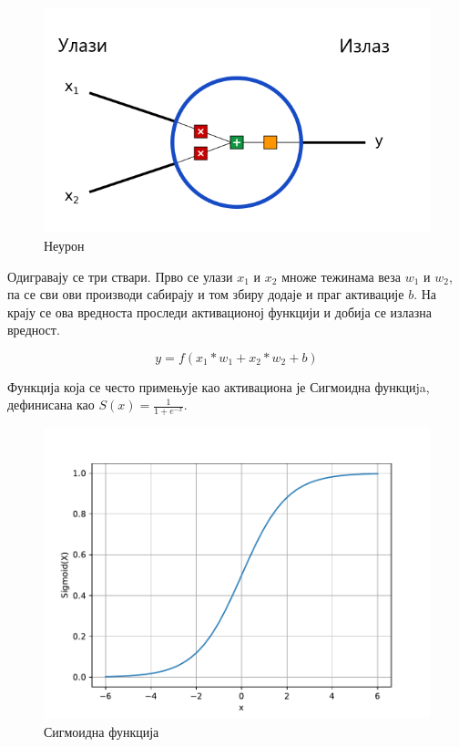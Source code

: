 \documentclass[12pt, а4paper]{article}
\begin{document}
\begin{figure}[H]
  \centering
      \includegraphics[scale=0.5]{slike/neuron}
  \caption{Неурон}
  \label{fig:neuron}
\end{figure}

Одигравају се три ствари. Прво се улази $x_1$ и $x_2$ множе тежинама
веза $w_1$ и $w_2$, па се сви ови производи сабирају
и том збиру додаје и праг активације $b$.
На крају се ова вредноста проследи активационој функцији и добија се излазна вредност.

\begin{equation}
 y = f(x_1 * w_1 + x_2 * w_2 + b)
\end{equation}

Функција која се често примењује као активациона је Сигмоидна функциja,
дефинисана као $S(x) = \frac{1}{1+e^{-x}}$.

\begin{figure}[H]
  \centering
      \includegraphics[scale=0.5]{slike/sigmoid}
  \caption{Сигмоидна функција}
  \label{fig:sigmoid}
\end{figure}
\end{document}

